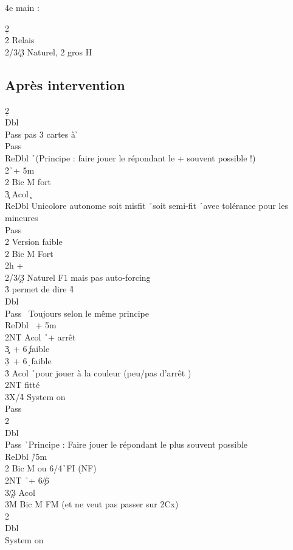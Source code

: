 \documentclass[a4paper]{article}
\begin{document}
\begin{bidtable}
4e \> main :
\end{bidtable}

\begin{bidtable}
2\d\+\\
2\h \> Relais\\
2\s/3\c/3\d \> Naturel, 2 gros H\-
\end{bidtable}

\subsection{Après intervention}

\begin{bidtable}
2\d\+\\
Dbl\+\\
Pass \> pas 3 cartes à \h \+\\
Pass\+\\
ReDbl \h\ (Principe : faire jouer le répondant le + souvent possible !)\\
2\h {}\h\ + 5m\\
2\s \> Bic M fort\\
3\c \> Acol \c \-\-\\
ReDbl \> Unicolore autonome soit misfit \h\ soit semi-fit \h\ avec tolérance pour les mineures\+\\
Pass\+\\
2\h \> Version faible\\
2\s \> Bic M Fort\-\-\\
2h + \h \\
2\s/3\c/3\d \> Naturel F1 mais pas auto-forcing\\
3\h \> permet de dire 4\h \+\\
Dbl\+\\
Pass \s\ Toujours selon le même principe\\
ReDbl \s\ + 5m\\
2NT \> Acol \h\ + arrêt \s \\
3\c {}\s\ + 6\c\ faible\\
3\d {}\s\ + 6\d\ faible\\
3\h \> Acol \h\ pour jouer à la couleur (peu/pas d'arrêt \s )\-\-\\
2NT \> fitté\\
3X/4\h \> System on\-\\
Pass\+\\
2\h\+\\
Dbl\+\\
Pass \h\ Principe : Faire jouer le répondant le plus souvent possible\\
ReDbl \h /5m\\
2\s \> Bic M ou 6\s /4\h\ FI (NF)\\
2NT \h\ + 6\c /6\d \\
3\c/3\d \> Acol\\
3M \> Bic M FM (et ne veut pas passer sur 2Cx)\-\-\\
2\s\+\\
Dbl\+\\
System \> on\-\-\-\-
\end{bidtable}
\end{document}
